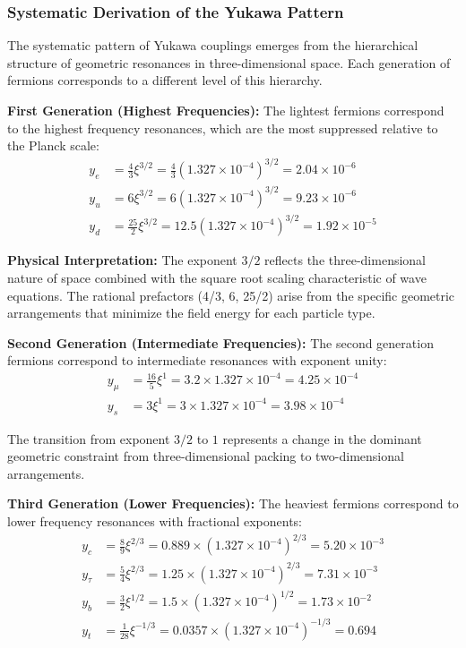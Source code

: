 \documentclass[12pt,a4paper]{article}
\newcommand{\xigeom}{\xi}
\begin{document}
	\subsubsection{Systematic Derivation of the Yukawa Pattern}
	
	The systematic pattern of Yukawa couplings emerges from the hierarchical structure of geometric resonances in three-dimensional space. Each generation of fermions corresponds to a different level of this hierarchy.
	
	\textbf{First Generation (Highest Frequencies):} The lightest fermions correspond to the highest frequency resonances, which are the most suppressed relative to the Planck scale:
	\begin{align}
		y_e &= \frac{4}{3} \xigeom^{3/2} = \frac{4}{3} (1.327 \times 10^{-4})^{3/2} = 2.04 \times 10^{-6} \\
		y_u &= 6 \xigeom^{3/2} = 6 (1.327 \times 10^{-4})^{3/2} = 9.23 \times 10^{-6} \\
		y_d &= \frac{25}{2} \xigeom^{3/2} = 12.5 (1.327 \times 10^{-4})^{3/2} = 1.92 \times 10^{-5}
	\end{align}
	
	\textbf{Physical Interpretation:} The exponent $3/2$ reflects the three-dimensional nature of space combined with the square root scaling characteristic of wave equations. The rational prefactors (4/3, 6, 25/2) arise from the specific geometric arrangements that minimize the field energy for each particle type.
	
	\textbf{Second Generation (Intermediate Frequencies):} The second generation fermions correspond to intermediate resonances with exponent unity:
	\begin{align}
		y_\mu &= \frac{16}{5} \xigeom^1 = 3.2 \times 1.327 \times 10^{-4} = 4.25 \times 10^{-4} \\
		y_s &= 3 \xigeom^1 = 3 \times 1.327 \times 10^{-4} = 3.98 \times 10^{-4}
	\end{align}
	
	The transition from exponent $3/2$ to $1$ represents a change in the dominant geometric constraint from three-dimensional packing to two-dimensional arrangements.
	
	\textbf{Third Generation (Lower Frequencies):} The heaviest fermions correspond to lower frequency resonances with fractional exponents:
	\begin{align}
		y_c &= \frac{8}{9} \xigeom^{2/3} = 0.889 \times (1.327 \times 10^{-4})^{2/3} = 5.20 \times 10^{-3} \\
		y_\tau &= \frac{5}{4} \xigeom^{2/3} = 1.25 \times (1.327 \times 10^{-4})^{2/3} = 7.31 \times 10^{-3} \\
		y_b &= \frac{3}{2} \xigeom^{1/2} = 1.5 \times (1.327 \times 10^{-4})^{1/2} = 1.73 \times 10^{-2} \\
		y_t &= \frac{1}{28} \xigeom^{-1/3} = 0.0357 \times (1.327 \times 10^{-4})^{-1/3} = 0.694
	\end{align}
	
\end{document}
